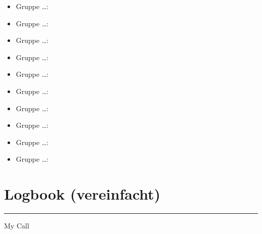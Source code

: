 \documentclass[a4paper,10pt]{article}
\begin{document}
\begin{itemize}
    \item Gruppe \hspace{1cm} \dots \hspace{1cm}:
    \item Gruppe \hspace{1cm} \dots \hspace{1cm}:
    \item Gruppe \hspace{1cm} \dots \hspace{1cm}:
    \item Gruppe \hspace{1cm} \dots \hspace{1cm}:
    \item Gruppe \hspace{1cm} \dots \hspace{1cm}:
    \item Gruppe \hspace{1cm} \dots \hspace{1cm}:
    \item Gruppe \hspace{1cm} \dots \hspace{1cm}:
    \item Gruppe \hspace{1cm} \dots \hspace{1cm}:
    \item Gruppe \hspace{1cm} \dots \hspace{1cm}:
    \item Gruppe \hspace{1cm} \dots \hspace{1cm}:
\end{itemize}

\clearpage

\section{Logbook (vereinfacht)}
    \label{att:log0}

    \bigskip
    \hspace{8cm}
    \begin{minipage}[t]{0.33\textwidth}
        \centering
        \hrule
        \vspace{0.5ex}
        \small My Call
    \end{minipage}
\end{document}
